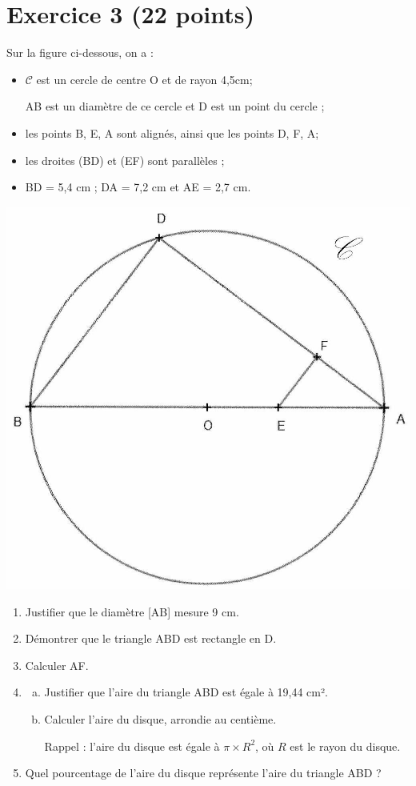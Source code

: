 \documentclass[a4paper,14pt]{extarticle}
\begin{document}
\section*{Exercice 3 (22 points)}
Sur la figure ci-dessous, on a :

\begin{itemize}
  \item $\mathscr{C}$ est un cercle de centre O et de rayon 4,5cm;
  \item [AB] est un diamètre de ce cercle et D est un point du cercle ;
  \item les points B, E, A sont alignés, ainsi que les points D, F, A;
  \item les droites (BD) et (EF) sont parallèles ;
  \item BD = 5,4 cm ; DA = 7,2 cm et AE = 2,7 cm.
\end{itemize}

\begin{center}
\includegraphics[max width=.5\textwidth]{ex3}
\end{center}

\begin{enumerate}
  \item Justifier que le diamètre [AB] mesure 9 cm.

  \item Démontrer que le triangle ABD est rectangle en D.

  \item Calculer AF.
  \item \begin{enumerate}[a.]
    \item Justifier que l'aire du triangle ABD est égale à 19,44 cm².

    \item Calculer l'aire du disque, arrondie au centième.

    Rappel : l'aire du disque est égale à $\pi \times R^{2}$, où $R$ est le rayon du disque.

    \end{enumerate}

  \item Quel pourcentage de l'aire du disque représente l'aire du triangle ABD ?
\end{enumerate}
\newpage
\end{document}
